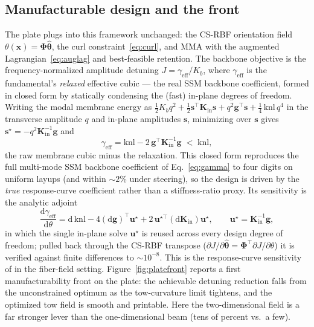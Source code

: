 \documentclass[11pt]{article}
\newcommand{\dd}{\mathrm{d}}
\begin{document}
\subsection{Manufacturable design and the front}
The plate plugs into this framework unchanged: the CS-RBF orientation field
$\theta(\bm x)=\bm\Phi\hat{\bm\theta}$, the curl constraint~\eqref{eq:curl}, and MMA with
the augmented Lagrangian~\eqref{eq:auglag} and best-feasible retention. The backbone objective is the
frequency-normalized amplitude detuning $J=\gamma_{\mathrm{eff}}/K_b$, where
$\gamma_{\mathrm{eff}}$ is the fundamental's \emph{relaxed} effective cubic --- the
real SSM backbone coefficient, formed in closed form by statically condensing the
(fast) in-plane degrees of freedom. Writing the modal membrane energy as
$\tfrac12 K_b q^2+\tfrac12\bm s^{\!\top}\bm K_{\mathrm{in}}\bm s
+q^2\bm g^{\!\top}\bm s+\tfrac14\,\mathrm{knl}\,q^4$ in the transverse amplitude
$q$ and in-plane amplitudes $\bm s$, minimizing over $\bm s$ gives
$\bm s^\star=-q^2\bm K_{\mathrm{in}}^{-1}\bm g$ and
\begin{equation}
\gamma_{\mathrm{eff}}=\mathrm{knl}-2\,\bm g^{\!\top}\bm K_{\mathrm{in}}^{-1}\bm g
\;<\;\mathrm{knl},
\label{eq:gammaeff}
\end{equation}
the raw membrane cubic minus the relaxation. This closed form reproduces the
full multi-mode SSM backbone coefficient of Eq.~\eqref{eq:gamma} to four digits on
uniform layups (and within $\sim\!2\%$ under steering), so the design is driven by
the \emph{true} response-curve coefficient rather than a stiffness-ratio proxy.
Its sensitivity is the analytic adjoint
\begin{equation}
\frac{\dd\gamma_{\mathrm{eff}}}{\dd\theta}
=\dd\,\mathrm{knl}-4(\dd\bm g)^{\!\top}\bm u^\star
+2\,\bm u^{\star\top}(\dd\bm K_{\mathrm{in}})\bm u^\star,
\qquad \bm u^\star=\bm K_{\mathrm{in}}^{-1}\bm g,
\label{eq:gammaeffadj}
\end{equation}
in which the single in-plane solve $\bm u^\star$ is reused across every design
degree of freedom; pulled back through the CS-RBF transpose
($\partial J/\partial\hat{\bm\theta}=\bm\Phi^{\!\top}\partial J/\partial\theta$)
it is verified against finite differences to $\sim\!10^{-8}$. This is the
response-curve sensitivity of \cite{pozzi2025,li2024} in the fiber-field setting.
Figure~\ref{fig:platefront} reports a first manufacturability front on the plate:
the achievable detuning reduction falls from the unconstrained optimum as the
tow-curvature limit tightens, and the optimized tow field is smooth and printable.
Here the two-dimensional field is a far stronger lever than the one-dimensional
beam (tens of percent vs.\ a few).
\end{document}
